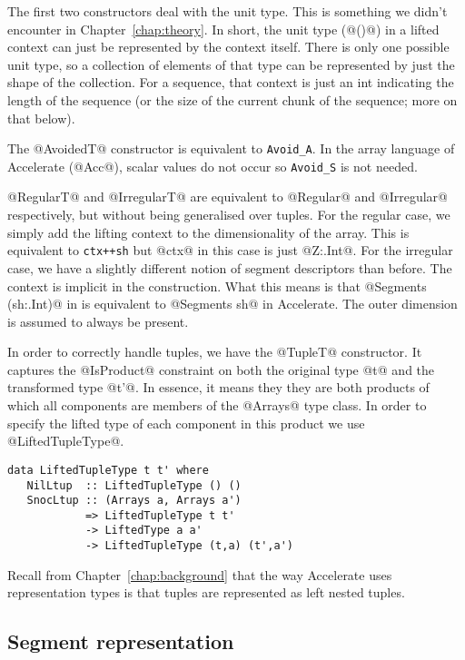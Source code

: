 The first two constructors deal with the unit type. This is something we didn't encounter in Chapter~\ref{chap:theory}. In short, the unit type (@()@) in a lifted context can just be represented by the context itself. There is only one possible unit type, so a collection of elements of that type can be represented by just the shape of the collection. For a sequence, that context is just an int indicating the length of the sequence (or the size of the current chunk of the sequence; more on that below).

The @AvoidedT@ constructor is equivalent to \lstinline[style=ndp]{Avoid_A}. In the array language of Accelerate (@Acc@), scalar values do not occur so \lstinline[style=ndp]{Avoid_S} is not needed.

@RegularT@ and @IrregularT@ are equivalent to @Regular@ and @Irregular@ respectively, but without being generalised over tuples. For the regular case, we simply add the lifting context to the dimensionality of the array. This is equivalent to \lstinline[style=ndp]{ctx++sh} but @ctx@ in this case is just @Z:.Int@. For the irregular case, we have a slightly different notion of segment descriptors than before. The context is implicit in the construction. What this means is that @Segments (sh:.Int)@ in \ndp{} is equivalent to @Segments sh@ in Accelerate. The outer dimension is assumed to always be present.

In order to correctly handle tuples, we have the @TupleT@ constructor. It captures the @IsProduct@ constraint on both the original type @t@ and the transformed type @t'@. In essence, it means they they are both products of which all components are members of the @Arrays@ type class. In order to specify the lifted type of each component in this product we use @LiftedTupleType@.
%
\begin{lstlisting}
data LiftedTupleType t t' where
   NilLtup  :: LiftedTupleType () ()
   SnocLtup :: (Arrays a, Arrays a')
            => LiftedTupleType t t'
            -> LiftedType a a'
            -> LiftedTupleType (t,a) (t',a')
\end{lstlisting}
%
Recall from Chapter~\ref{chap:background} that the way Accelerate uses representation types is that tuples are represented as left nested tuples.


\subsection{Segment representation}

